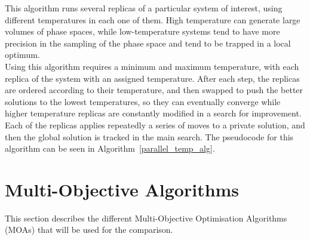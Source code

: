 This algorithm runs several replicas of a particular system of interest, using different temperatures in each one of them. High temperature can generate large volumes of phase spaces, while low-temperature systems tend to have more precision in the sampling of the phase space and tend to be trapped in a local optimum. \\

Using this algorithm requires a minimum and maximum temperature, with each replica of the system with an assigned temperature. After each step, the replicas are ordered according to their temperature, and then swapped to push the better solutions to the lowest temperatures, so they can eventually converge while higher temperature replicas are constantly modified in a search for improvement. Each of the replicas applies repeatedly a series of moves to a private solution, and then the global solution is tracked in the main search. The pseudocode for this algorithm can be seen in Algorithm~\ref{parallel_temp_alg}.\\

\begin{algorithm}[H]
\caption{Parallel Tempering}
\label{parallel_temp_alg}
\SetAlgoLined
{}
\end{algorithm}

\section{Multi-Objective Algorithms}

This section describes the different Multi-Objective Optimisation Algorithms (MOAs) that will be used for the comparison.


